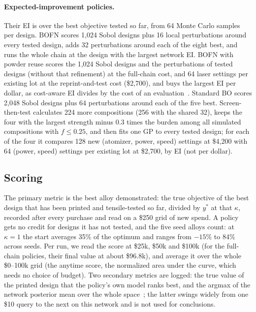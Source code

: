 \documentclass[11pt]{article}
\begin{document}
\paragraph{Expected-improvement policies.} Their EI is over the best objective
tested so far, from 64 Monte Carlo samples per design. BOFN scores 1,024 Sobol
designs plus 16 local perturbations around every tested design, adds 32
perturbations around each of the eight best, and runs the whole chain at the
design with the largest network EI. BOFN with powder reuse scores the 1,024 Sobol
designs and the perturbations of tested designs (without that refinement) at the
full-chain cost, and 64 laser settings per existing lot at the reprint-and-test
cost (\$2,700), and buys the largest EI per dollar, as cost-aware EI divides by
the cost of an evaluation~\cite{snoek2012}. Standard BO scores 2,048 Sobol
designs plus 64 perturbations around each of the five best. Screen-then-test
calculates 224 more compositions (256 with the shared 32), keeps the four with
the largest strength minus 0.3 times the burden among all simulated compositions
with $f\le0.25$, and then fits one GP to every tested design; for each of the
four it compares 128 new (atomizer, power, speed) settings at \$4,200 with 64
(power, speed) settings per existing lot at \$2,700, by EI (not per dollar).

\subsection*{Scoring}

The primary metric is the best alloy demonstrated: the true objective of the
best design that has been printed and tensile-tested so far, divided by $y^*$
at that $\kappa$, recorded after every purchase and read on a \$250 grid of new
spend. A policy gets no credit for designs it has not tested, and the five seed
alloys count: at $\kappa=1$ the start averages 35\% of the optimum and ranges
from $-15$\% to 84\% across seeds. Per run, we read the score at \$25k, \$50k
and \$100k (for the full-chain policies, their final value at about \$96.8k),
and average it over the whole \$0--100k grid (the anytime score, the normalized
area under the curve, which needs no choice of budget). Two secondary metrics are logged: the true value of the printed
design that the policy's own model ranks best, and the argmax of the network
posterior mean over the whole space~\cite{buathong2024}; the latter swings
widely from one \$10 query to the next on this network and is not used for
conclusions.
\end{document}
